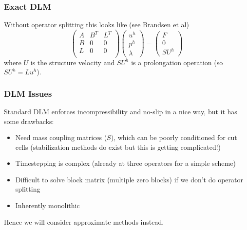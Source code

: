 \documentclass[8pt]{beamer}
\begin{document}
\begin{frame}
  \frametitle{Exact DLM}
  Without operator splitting this looks like (see Brandsen et al)
  \begin{equation}
    \begin{pmatrix}
      A & B^T & L^T \\
      B & 0   & 0   \\
      L & 0   & 0   \\
    \end{pmatrix}
    \begin{pmatrix}
      u^h \\ p^h \\ \lambda
    \end{pmatrix}
    =
    \begin{pmatrix}
      F \\ 0  \\ S U^h
    \end{pmatrix}
  \end{equation}
  where $U$ is the structure velocity and $S U^h$ is a prolongation operation
  (so $S U^h = L u^h$).
\end{frame}

\begin{frame}
  \frametitle{DLM Issues}
  Standard DLM enforces incompressibility and no-slip in a nice way, but it has
  some drawbacks:
  \begin{itemize}
    \item Need mass coupling matrices ($S$), which can be poorly conditioned for
      cut cells (stabilization methods do exist but this is getting complicated!)
    \item Timestepping is complex (already at three operators for a simple scheme)
    \item Difficult to solve block matrix (multiple zero blocks) if we don't do
      operator splitting
    \item Inherently monolithic
  \end{itemize}

  Hence we will consider approximate methods instead.
\end{frame}
\end{document}
